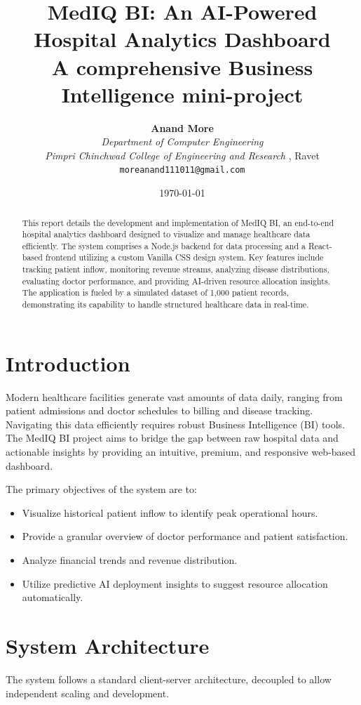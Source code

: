 \documentclass[12pt,a4paper]{report}
\title{\textbf{MedIQ BI: An AI-Powered Hospital Analytics Dashboard}\\
\vspace{0.5cm}
\large A comprehensive Business Intelligence mini-project}
\author{
    \textbf{Anand More} \\ 
    \textit{Department of Computer Engineering} \\
    \textit{Pimpri Chinchwad College of Engineering and Research}
    , Ravet \\ 
    \texttt{moreanand111011@gmail.com}
}
\date{\today}
\begin{document}
\maketitle

\begin{abstract}
This report details the development and implementation of MedIQ BI, an end-to-end hospital analytics dashboard designed to visualize and manage healthcare data efficiently. The system comprises a Node.js backend for data processing and a React-based frontend utilizing a custom Vanilla CSS design system. Key features include tracking patient inflow, monitoring revenue streams, analyzing disease distributions, evaluating doctor performance, and providing AI-driven resource allocation insights. The application is fueled by a simulated dataset of 1,000 patient records, demonstrating its capability to handle structured healthcare data in real-time.
\end{abstract}

\tableofcontents
\newpage

\chapter{Introduction}
Modern healthcare facilities generate vast amounts of data daily, ranging from patient admissions and doctor schedules to billing and disease tracking. Navigating this data efficiently requires robust Business Intelligence (BI) tools. The MedIQ BI project aims to bridge the gap between raw hospital data and actionable insights by providing an intuitive, premium, and responsive web-based dashboard. 

The primary objectives of the system are to:
\begin{itemize}
    \item Visualize historical patient inflow to identify peak operational hours.
    \item Provide a granular overview of doctor performance and patient satisfaction.
    \item Analyze financial trends and revenue distribution.
    \item Utilize predictive AI deployment insights to suggest resource allocation automatically.
\end{itemize}

\chapter{System Architecture}
The system follows a standard client-server architecture, decoupled to allow independent scaling and development.
\end{document}
